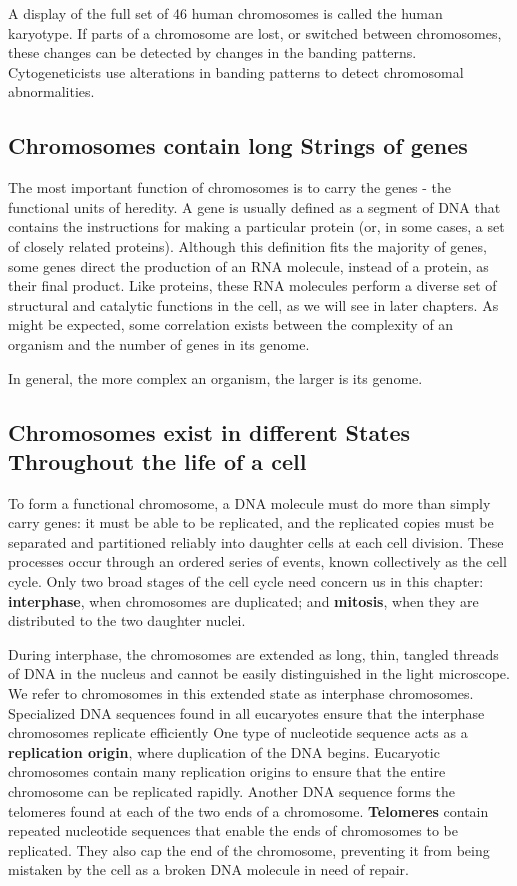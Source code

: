 A display of the full set of 46 human chromosomes is called the human
karyotype. If parts of a chromosome are lost, or switched between chromosomes,
these changes can be detected by changes in the banding
patterns. Cytogeneticists use alterations in banding patterns to detect
chromosomal abnormalities.

\subsection{Chromosomes contain long Strings of genes}

The most important function of chromosomes is to carry the genes - the
functional units of heredity. A gene is usually defined as a
segment of DNA that contains the instructions for making a particular
protein (or, in some cases, a set of closely related proteins). Although
this definition fits the majority of genes, some genes direct the production
of an RNA molecule, instead of a protein, as their final product. Like
proteins, these RNA molecules perform a diverse set of structural and
catalytic functions in the cell, as we will see in later chapters.
As might be expected, some correlation exists between the complexity
of an organism and the number of genes in its genome.

In general, the more complex an organism, the larger is its genome.

\subsection{Chromosomes exist in different States Throughout the life of a cell}

To form a functional chromosome, a DNA molecule must do more than
simply carry genes: it must be able to be replicated, and the replicated
copies must be separated and partitioned reliably into daughter cells at
each cell division. These processes occur through an ordered series of
events, known collectively as the cell cycle.
Only two broad stages of the cell cycle need concern
us in this chapter: \textbf{interphase}, when chromosomes are duplicated; and
\textbf{mitosis}, when they are distributed to the two daughter nuclei.

During interphase, the chromosomes are extended as long, thin, tangled
threads of DNA in the nucleus and cannot be easily distinguished
in the light microscope. We refer to chromosomes in this extended state
as interphase chromosomes. Specialized DNA sequences found in all
eucaryotes ensure that the interphase chromosomes replicate efficiently
One type of nucleotide sequence acts as a \textbf{replication origin}, where duplication of the DNA begins.
Eucaryotic chromosomes contain many replication origins to ensure that
the entire chromosome can be replicated rapidly. Another DNA sequence
forms the telomeres found at each of the two ends of a chromosome.
\textbf{Telomeres} contain repeated nucleotide sequences that enable the ends
of chromosomes to be replicated. They also
cap the end of the chromosome, preventing it from being mistaken by the
cell as a broken DNA molecule in need of repair.

